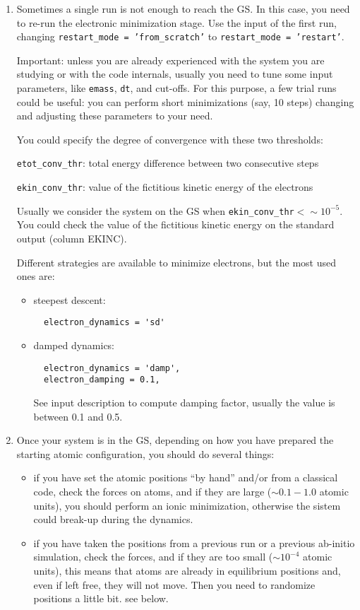 \documentclass[12pt,a4paper]{article}
\begin{document}
\begin{enumerate}
  \item
    Sometimes a single run is not enough to reach the GS.
    In this case, you need to re-run the electronic minimization
    stage.
    Use the input of the first run, changing \texttt{restart\_mode =
    'from\_scratch'} to \texttt{restart\_mode = 'restart'}.

    Important: unless you are already experienced with the system you
    are studying or with the code internals, usually you need to tune
    some input parameters, like \texttt{emass}, \texttt{dt}, and
    cut-offs.
    For this purpose, a few trial runs could be useful: you can
    perform short minimizations (say, 10 steps) changing and adjusting
    these parameters to your need.

    You could specify the degree of convergence with these two
    thresholds:

    \texttt{etot\_conv\_thr}: total energy difference between two
    consecutive steps

    \texttt{ekin\_conv\_thr}: value of the fictitious kinetic energy
    of the electrons

    Usually we consider the system on the GS when
    \texttt{ekin\_conv\_thr}${} < \sim 10^{-5}$.
    You could check the value of the fictitious kinetic energy on the 
    standard output (column EKINC).

    Different strategies are available to minimize electrons, but the
    most used ones are:
    \begin{itemize}
      \item
        steepest descent:
\begin{verbatim}
  electron_dynamics = 'sd'
\end{verbatim}
      \item
         damped dynamics:
\begin{verbatim}
  electron_dynamics = 'damp', 
  electron_damping = 0.1,
\end{verbatim}
         See input description to compute damping factor, usually the
         value is between 0.1 and 0.5.
    \end{itemize}

  \item
    Once your system is in the GS, depending on how you have prepared
    the starting atomic configuration, you should do several things:
    \begin{itemize}
      \item
        if you have set the atomic positions ``by hand'' and/or from a
        classical code, check the forces on atoms, and if they are
        large ($\sim 0.1 - 1.0$ atomic units), you should perform an
        ionic minimization, otherwise the sistem could break-up during
        the dynamics.
      \item
        if you have taken the positions from a previous run or a
        previous ab-initio simulation, check the forces, and if they
        are too small ($\sim 10^{-4}$ atomic units), this means that
        atoms are already in equilibrium positions and, even if left
        free, they will not move.
        Then you need to randomize positions a little bit. see below.
    \end{itemize}


\end{enumerate}
\end{document}
